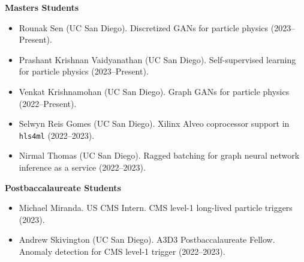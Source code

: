 \documentclass[11pt]{res}
\begin{document}
\begin{resume}
  \textbf{Masters Students}
  \begin{itemize}
    \itemsep-0.3em
    \item Rounak Sen (UC San Diego). Discretized GANs for particle physics (2023--Present).
    \item Prashant Krishnan Vaidyanathan (UC San Diego). Self-supervised learning for particle physics  (2023--Present).
    \item Venkat Krishnamohan (UC San Diego). Graph GANs for particle physics ({2022--Present}).
    \item Selwyn Reis Gomes (UC San Diego). Xilinx Alveo coprocessor support in \texttt{hls4ml} ({2022--2023}).
    \item Nirmal Thomas (UC San Diego). Ragged batching for graph neural network inference as a service ({2022--2023}).
  \end{itemize}

  \textbf{Postbaccalaureate Students}
  \begin{itemize}
    \item Michael Miranda. US CMS Intern. CMS level-1 long-lived particle triggers (2023).
    \item Andrew Skivington (UC San Diego). A3D3 Postbaccalaureate Fellow. Anomaly detection for CMS level-1 trigger ({2022--2023}).
  \end{itemize}


\end{resume}
\end{document}
